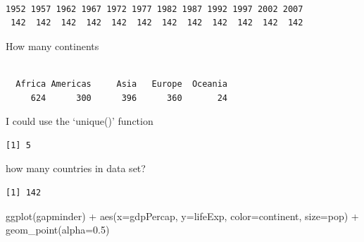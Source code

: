 \documentclass[
  letterpaper,
  DIV=11,
  numbers=noendperiod]{scrartcl}
\newenvironment{Shaded}{\begin{snugshade}}{\end{snugshade}}
\newcommand{\AttributeTok}[1]{\textcolor[rgb]{0.40,0.45,0.13}{#1}}
\newcommand{\FloatTok}[1]{\textcolor[rgb]{0.68,0.00,0.00}{#1}}
\newcommand{\FunctionTok}[1]{\textcolor[rgb]{0.28,0.35,0.67}{#1}}
\newcommand{\NormalTok}[1]{\textcolor[rgb]{0.00,0.23,0.31}{#1}}
\newcommand{\SpecialCharTok}[1]{\textcolor[rgb]{0.37,0.37,0.37}{#1}}
\begin{document}
\begin{verbatim}

1952 1957 1962 1967 1972 1977 1982 1987 1992 1997 2002 2007 
 142  142  142  142  142  142  142  142  142  142  142  142 
\end{verbatim}

How many continents

\begin{Shaded}
\end{Shaded}

\begin{verbatim}

  Africa Americas     Asia   Europe  Oceania 
     624      300      396      360       24 
\end{verbatim}

I could use the `unique()' function

\begin{Shaded}
\end{Shaded}

\begin{verbatim}
[1] 5
\end{verbatim}

how many countries in data set?

\begin{Shaded}
\end{Shaded}

\begin{verbatim}
[1] 142
\end{verbatim}

\begin{Shaded}
\begin{Highlighting}[]
\FunctionTok{ggplot}\NormalTok{(gapminder) }\SpecialCharTok{+} \FunctionTok{aes}\NormalTok{(}\AttributeTok{x=}\NormalTok{gdpPercap, }\AttributeTok{y=}\NormalTok{lifeExp, }\AttributeTok{color=}\NormalTok{continent, }\AttributeTok{size=}\NormalTok{pop) }\SpecialCharTok{+} \FunctionTok{geom\_point}\NormalTok{(}\AttributeTok{alpha=}\FloatTok{0.5}\NormalTok{)}
\end{Highlighting}
\end{Shaded}
\end{document}
